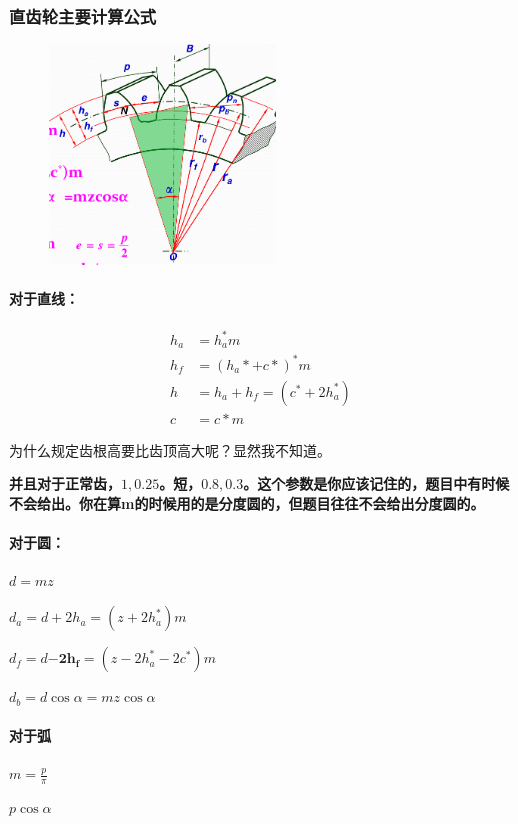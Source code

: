 \documentclass[twocolumn]{ctexart}
\begin{document}
\subsubsection{直齿轮主要计算公式}
        \begin{figure}[H]
            \centering
            \includegraphics[width=6cm]{img/3.png}
            \end{figure}
\paragraph{对于直线：}
\begin{align*}
h_a&=h_a^*m\\
h_f&=(h_a*+c*)^*m\\
h&=h_a+h_f=(c^*+2h_a^*)\\
c&=c*m
\end{align*}

为什么规定齿根高要比齿顶高大呢？显然我不知道。

\textbf{并且对于正常齿，$1,0.25$。短，$0.8,0.3$。这个参数是你应该记住的，题目中有时候不会给出。你在算m的时候用的是分度圆的，但题目往往不会给出分度圆的。}


\paragraph{对于圆：}
\begin{description}[leftmargin=2.3cm,style=nextline,nosep]%
  \item[分度圆直径] $d=mz$
  \item[齿顶圆直径] $d_a=d+2h_a=(z+2h_a^*)m$
  \item[齿根圆直径] $d_f=d\mathbf{-2h_f} =(z-2h_a^*-2c^*)m$  
  \item[基圆半径] $d_b=d\cos \alpha=mz\cos \alpha$ 
\end{description}

\paragraph{对于弧}
\begin{description}[leftmargin=2.3cm,style=nextline,nosep]%
  \item[分度圆齿距] $m=\frac{p}{\pi}$
  \item[法向齿距] $p \cos \alpha$
\end{description}
\end{document}
